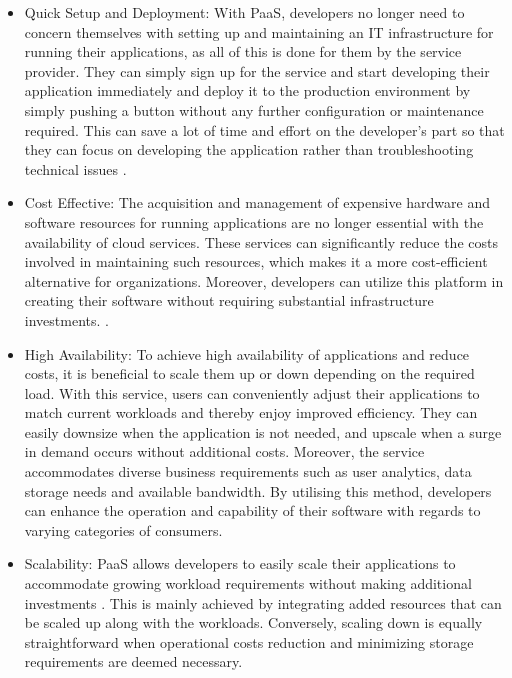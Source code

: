 \documentclass[BIF,Bachelor,nenglish]{twbook}%
\begin{document}
\begin{itemize}
\item Quick Setup and Deployment: With \ac{PaaS}, developers no longer need to concern themselves with setting up and maintaining an IT infrastructure for running their applications, as all of this is done for them by the service provider. They can simply sign up for the service and start developing their application immediately and deploy it to the production environment by simply pushing a button without any further configuration or maintenance required. This can save a lot of time and effort on the developer's part so that they can focus on developing the application rather than troubleshooting technical issues \cite{law2008}.

\item Cost Effective: The acquisition and management of expensive hardware and software resources for running applications are no longer essential with the availability of cloud services. These services can significantly reduce the costs involved in maintaining such resources, which makes it a more cost-efficient alternative for organizations. Moreover, developers can utilize this platform in creating their software without requiring substantial infrastructure investments. \cite{gai2014}.

\item High Availability: To achieve high availability of applications and reduce costs, it is beneficial to scale them up or down depending on the required load. With this service, users can conveniently adjust their applications to match current workloads and thereby enjoy improved efficiency. They can easily downsize when the application is not needed, and upscale when a surge in demand occurs without additional costs. Moreover, the service accommodates diverse business requirements such as user analytics, data storage needs and available bandwidth. By utilising this method, developers can enhance the operation and capability of their software with regards to varying categories of consumers\cite{IaasHigh}.

\item Scalability: \ac{PaaS} allows developers to easily scale their applications to accommodate growing workload requirements without making additional investments \cite{law2008}. This is mainly achieved by integrating added resources that can be scaled up along with the workloads. Conversely, scaling down is equally straightforward when operational costs reduction and minimizing storage requirements are deemed necessary.
\end{itemize}
\end{document}
